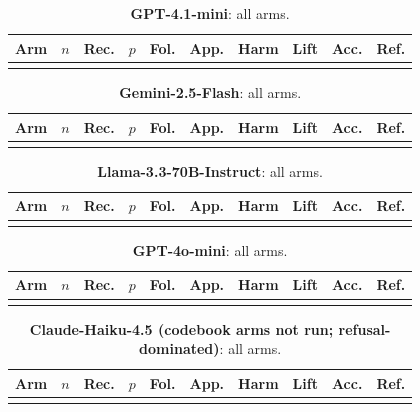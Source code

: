 \newcommand{\fulltable}[2]{%
\begin{table}[!htbp]
\centering\scriptsize
\setlength{\tabcolsep}{3.2pt}
\caption{\textbf{#2}: all arms.}
\begin{tabular}{@{}lrlllllllr@{}}
\toprule
Arm & $n$ & Rec. & $p$ & Fol. & App. & Harm & Lift & Acc. & Ref. \\
\midrule
\tabinput{../results/appendix/full_#1.tex}
\bottomrule
\end{tabular}
\end{table}}
\fulltable{gpt-4.1-mini}{GPT-4.1-mini}
\fulltable{gemini-2.5-flash}{Gemini-2.5-Flash}
\fulltable{llama-3.3-70b-instruct}{Llama-3.3-70B-Instruct}
\fulltable{gpt-4o-mini}{GPT-4o-mini}
\fulltable{claude-haiku-4.5}{Claude-Haiku-4.5 (codebook arms not run; refusal-dominated)}
\clearpage

